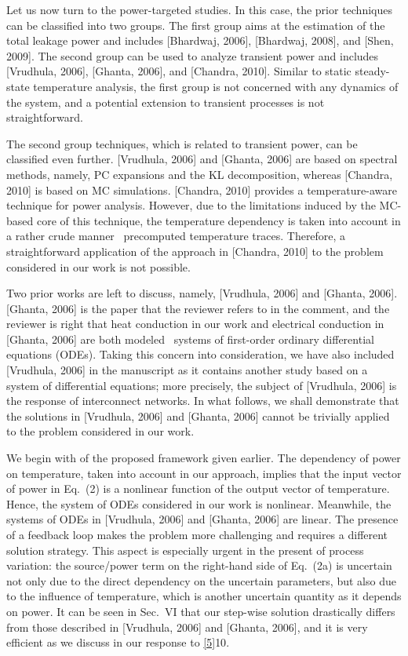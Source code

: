 \begin{authors}
Let us now turn to the power-targeted studies.
In this case, the prior techniques can be classified into two groups.
The first group aims at the estimation of the total leakage power and includes [Bhardwaj, 2006], [Bhardwaj, 2008], and [Shen, 2009].
The second group can be used to analyze transient power and includes [Vrudhula, 2006], [Ghanta, 2006], and [Chandra, 2010].
Similar to static steady-state temperature analysis, the first group is not concerned with any dynamics of the system, and a potential extension to transient processes is not straightforward.

The second group techniques, which is related to transient power, can be classified even further.
[Vrudhula, 2006] and [Ghanta, 2006] are based on spectral methods, namely, PC expansions and the KL decomposition, whereas [Chandra, 2010] is based on MC simulations.
[Chandra, 2010] provides a temperature-aware technique for power analysis.
However, due to the limitations induced by the MC-based core of this technique, the temperature dependency is taken into account in a rather crude manner \via\ precomputed temperature traces.
Therefore, a straightforward application of the approach in [Chandra, 2010] to the problem considered in our work is not possible.

Two prior works are left to discuss, namely, [Vrudhula, 2006] and [Ghanta, 2006].
[Ghanta, 2006] is the paper that the reviewer refers to in the comment, and the reviewer is right that heat conduction in our work and electrical conduction in [Ghanta, 2006] are both modeled \via\ systems of first-order ordinary differential equations (ODEs).
Taking this concern into consideration, we have also included [Vrudhula, 2006] in the manuscript as it contains another study based on a system of differential equations; more precisely, the subject of [Vrudhula, 2006] is the response of interconnect networks.
In what follows, we shall demonstrate that the solutions in [Vrudhula, 2006] and [Ghanta, 2006] cannot be trivially applied to the problem considered in our work.

We begin with  of the proposed framework given earlier.
The dependency of power on temperature, taken into account in our approach, implies that the input vector of power in Eq.~(2) is a nonlinear function of the output vector of temperature.
Hence, the system of ODEs considered in our work is nonlinear.
Meanwhile, the systems of ODEs in [Vrudhula, 2006] and [Ghanta, 2006] are linear.
The presence of a feedback loop makes the problem more challenging and requires a different solution strategy.
This aspect is especially urgent in the present of process variation: the source/power term on the right-hand side of Eq.~(2a) is uncertain not only due to the direct dependency on the uncertain parameters, but also due to the influence of temperature, which is another uncertain quantity as it depends on power.
It can be seen in Sec.~VI that our step-wise solution drastically differs from those described in [Vrudhula, 2006] and [Ghanta, 2006], and it is very efficient as we discuss in our response to \cref{5}{10}.


\end{authors}
